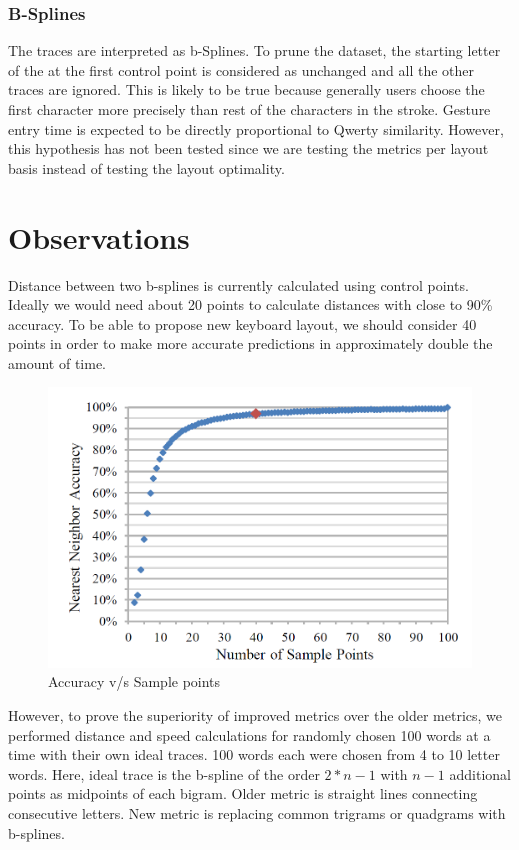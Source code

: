 \documentclass[MTech]{iitmdiss}
\begin{document}
\subsection{B-Splines}
The traces are interpreted as b-Splines. To prune the dataset, the starting letter of the at the first control point is considered as unchanged and all the other traces are ignored. This is likely to be true because generally users choose the first character more precisely than rest of the characters in the stroke. Gesture entry time is expected to be directly proportional to Qwerty similarity. However, this hypothesis has not been tested since we are testing the metrics per layout basis instead of testing the layout optimality.

\chapter{Observations}
Distance between two b-splines is currently calculated using control points. Ideally we would need about 20 points to calculate distances with close to 90\% accuracy. To be able to propose new keyboard layout, we should consider 40 points in order to make more accurate predictions in approximately double the amount of time.

\begin{figure}[h!]
	\centering
	\includegraphics[scale=0.5]{Images/accuracy}
	\caption{Accuracy v/s Sample points }
\end{figure}

However, to prove the superiority of improved metrics over the older metrics, we performed distance and speed calculations for randomly chosen 100 words at a time with their own ideal traces. 100 words each were chosen from 4 to 10 letter words. Here, ideal trace is the b-spline of the order $2*n-1$ with $n-1$ additional points as midpoints of each bigram. Older metric is straight lines connecting consecutive letters. New metric is replacing common trigrams or quadgrams with b-splines.
\end{document}
